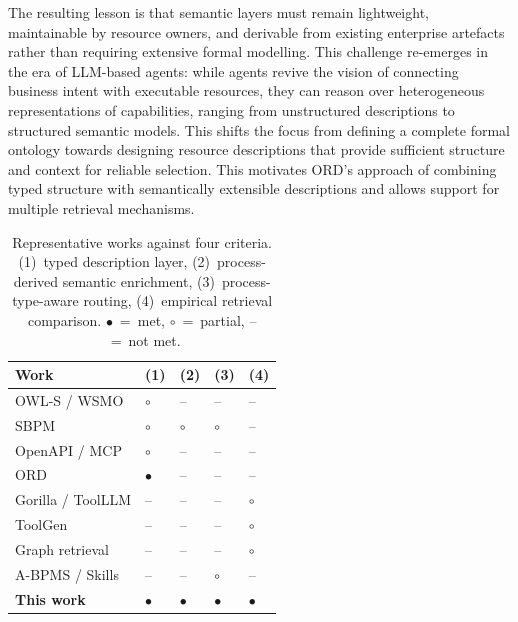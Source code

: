 \documentclass[10pt,twocolumn]{article}
\begin{document}
The resulting lesson is that semantic layers must remain lightweight, maintainable by resource owners, and derivable from existing enterprise artefacts rather than requiring extensive formal modelling. This challenge re-emerges in the era of LLM-based agents: while agents revive the vision of connecting business intent with executable resources, they can reason over heterogeneous representations of capabilities, ranging from unstructured descriptions to structured semantic models. This shifts the focus from defining a complete formal ontology towards designing resource descriptions that provide sufficient structure and context for reliable selection. This motivates ORD’s approach of combining typed structure with semantically extensible descriptions and allows support for multiple retrieval mechanisms.



\begin{table}[t]
  \renewcommand{\arraystretch}{1.2}
  \caption{Representative works against four criteria. (1)~typed description layer, (2)~process-derived semantic enrichment, (3)~process-type-aware routing, (4)~empirical retrieval comparison. $\bullet$~=~met, $\circ$~=~partial, --~=~not met.}
  \label{tab:rw-comparison}
  \centering\small
  \setlength{\tabcolsep}{3pt}
  \begin{tabularx}{\columnwidth}{@{} l
      >{\centering\arraybackslash}X
      >{\centering\arraybackslash}X
      >{\centering\arraybackslash}X
      >{\centering\arraybackslash}X @{}}
    \toprule
    \textbf{Work} & \textbf{(1)} & \textbf{(2)} & \textbf{(3)} & \textbf{(4)} \\
    \midrule
    OWL-S / WSMO \citep{mcilraith_semantic_2001,feier_towards_2005}  & $\circ$ & -- & -- & -- \\
    SBPM \citep{hepp2005,pedrinaci_semantic_2008} & $\circ$ & $\circ$ & $\circ$ & -- \\
    OpenAPI / MCP \citep{schwichtenberg_open_2017,noauthor_specification_nodate} & $\circ$ & -- & -- & -- \\
    ORD \citep{linux_foundation_europe_open_nodate}        & $\bullet$ & -- & -- & -- \\
    Gorilla / ToolLLM \citep{gonzalez_gorilla_2024,qin_toolllm_nodate} & -- & -- & -- & $\circ$ \\
    ToolGen \citep{wang_toolgen_2025} & -- & -- & -- & $\circ$ \\
    Graph retrieval \citep{nizar_agent-as--graph_2026}   & -- & -- & -- & $\circ$ \\
    A-BPMS / Skills \citep{dumas_agentic_2026,anthropic_skills_2025} & -- & -- & $\circ$ & -- \\
    \midrule
    \textbf{This work}  & $\bullet$ & $\bullet$ & $\bullet$ & $\bullet$ \\
    \bottomrule
  \end{tabularx}
\end{table}
\end{document}
